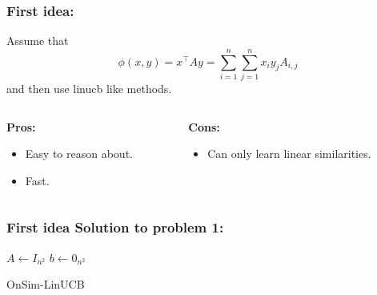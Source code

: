 \documentclass{beamer}
\begin{document}
\begin{frame}{}
    \frametitle{First idea:}
    Assume that
    \[\phi(x, y) = x^\top A y = \sum_{i =1}^n\sum_{j=1}^n x_i y_j A_{i,j} \]
    and then use linucb like methods.

    \vspace{1cm}
    \begin{columns}
        \begin{column}{0.5\textwidth}
            \textbf{Pros:}
            \begin{itemize}
                \item Easy to reason about.
                \item Fast.
            \end{itemize}
            \end{column}

            \begin{column}{0.5\textwidth}
            \textbf{Cons:}
            \begin{itemize}
                \item Can only learn linear similarities.
            \end{itemize}
            \end{column}
    \end{columns}
\end{frame}

\begin{frame}{}
    \frametitle{First idea Solution to problem 1:}
    {\small
    \begin{algorithm}[H]
          $A \gets I_{n^2}$\;
          $b \gets 0_{n^2}$\;
        \caption{OnSim-LinUCB}\label{algo:active-linucb}

      \end{algorithm}
    }
\end{frame}
\end{document}
